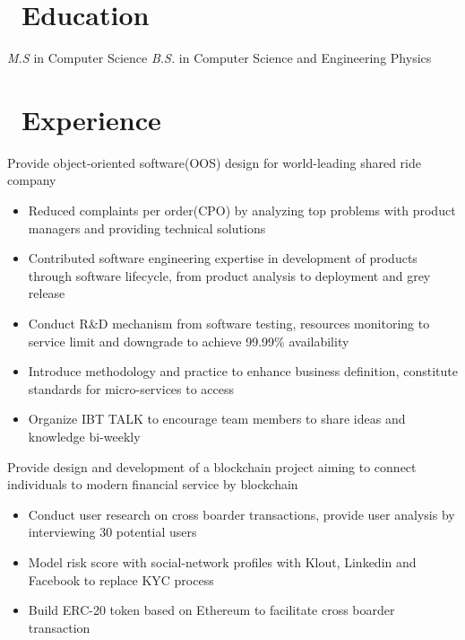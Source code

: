 \documentclass{resume}
\begin{document}



\section{\faGraduationCap\ Education}
\textit{M.S} in Computer Science
\textit{B.S.} in Computer Science and Engineering Physics

\section{\faUsers\ Experience}
Provide object-oriented software(OOS) design for world-leading shared ride company
\begin{itemize}
  \item Reduced complaints per order(CPO) by analyzing top problems with product managers and providing technical solutions
  \item Contributed software engineering expertise in development of products through software lifecycle, from product analysis to deployment and grey release
  \item Conduct R\&D mechanism from software testing, resources monitoring to service limit and downgrade to achieve 99.99\% availability
  \item Introduce methodology and practice to enhance business definition, constitute standards for micro-services to access
  \item Organize IBT TALK to encourage team members to share ideas and knowledge bi-weekly
\end{itemize}

Provide design and development of a blockchain project aiming to connect individuals to modern financial service by blockchain
\begin{itemize}
  \item Conduct user research on cross boarder transactions, provide user analysis by interviewing 30 potential users
  \item Model risk score with social-network profiles with Klout, Linkedin and Facebook to replace KYC process
  \item Build ERC-20 token based on Ethereum to facilitate cross boarder transaction
\end{itemize}
\end{document}
